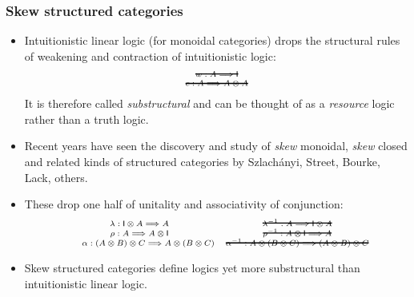 \documentclass[10pt,t]{beamer}
\newcommand{\mathsout}[1]%
{\bgroup\mathchoice
  {\sbox0{$\displaystyle{#1}$}%
    \usebox0\hspace{-\wd0}%
    \rule[0.5\ht0-0.5\dp0-.5pt]{\wd0}{1pt}}%
  {\sbox0{$\textstyle{#1}$}%
    \usebox0\hspace{-\wd0}%
    \rule[0.5\ht0-0.5\dp0-.5pt]{\wd0}{1pt}}%
  {\sbox0{$\scriptstyle{#1}$}%
    \usebox0\hspace{-\wd0}%
    \rule[0.5\ht0-0.5\dp0-.5pt]{\wd0}{1pt}}%
  {\sbox0{$\scriptscriptstyle{#1}$}%
    \usebox0\hspace{-\wd0}%
    \rule[0.5\ht0-0.5\dp0-.5pt]{\wd0}{1pt}}%
\egroup}
\newcommand{\I}{\mathsf{I}}
\newcommand{\ot}{\otimes}
\newcommand{\al}{\alpha}
\newcommand{\lam}{\lambda}
\newcommand{\tto}{\Longrightarrow}
\begin{document}
\begin{frame}

\frametitle{Skew structured categories}

\begin{itemize}

\item Intuitionistic linear logic (for monoidal categories) drops the
  structural rules of weakening and contraction of intuitionistic
  logic:
\[
\scriptsize
\begin{array}{c}
\mathsout{w : A \tto \I}
\\
\mathsout{c : A \tto A \otimes A}
\end{array}
\]
It is therefore called \emph{substructural} and can be thought of as a
\emph{resource} logic rather than a truth logic.

\bigskip

\item Recent years have seen the discovery and study of \emph{skew}
  monoidal, \emph{skew} closed and related kinds of structured
  categories by Szlach\'anyi, Street, Bourke, Lack, others.

\item These drop one half of unitality and associativity of
  conjunction:
\[
\scriptsize
\begin{array}{cc}
\lam: \I \ot A \tto A 
& 
\mathsout{\lam^{-1} : A \tto \I \otimes A} \\
\rho: A \tto A \ot \I 
& 
\mathsout{\rho^{-1} : A \ot \I \tto A} \\
\qquad
\al : (A \ot B) \ot C \tto A \ot (B \ot C) 
& 
\mathsout{\al^{-1} : A \ot (B \ot C) \tto (A \ot B) \ot C}
\end{array}
\]

\item Skew structured categories define logics yet more substructural
  than intuitionistic linear logic.

\end{itemize}

\end{frame}
\end{document}
